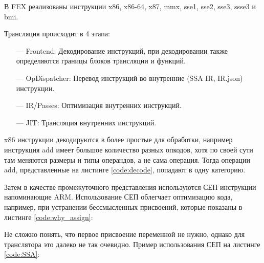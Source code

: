 В FEX реализованы инструкции x86, x86-64, x87, mmx, sse1, sse2, sse3, ssse3 и bmi. 

Трансляция происходит в 4 этапа:

\begin{itemize}[leftmargin=1.6\parindent]
	\item[---] Frontend: Декодирование инструкций, при декодировании также определяются границы блоков трансляции и функций.
	\item[---] OpDispatcher: Перевод инструкций во внутренние (SSA IR, IR.json) инструкции.
	\item[---] IR/Passes: Оптимизация внутренних инструкций.
	\item[---] JIT: Трансляция внутренних инструкций.
\end{itemize}

x86 инструкции декодируются в более простые для обработки, например инструкция add имеет большое количество разных опкодов, хотя по своей сути там меняются размеры и типы операндов, а не сама операция. Тогда операции add, представленные на листинге \ref{code:decode}, попадают в одну категорию.


Затем в качестве промежуточного представления используются СЕП инструкции напоминающие ARM. Использование СЕП облегчает оптимизацию кода, например, при устранении бессмысленных присвоений, которые показаны в листинге \ref{code:why_assign}:

Не сложно понять, что первое присвоение переменной не нужно, однако для транслятора это далеко не так очевидно. Пример использования СЕП на листинге \ref{code:SSA}:

